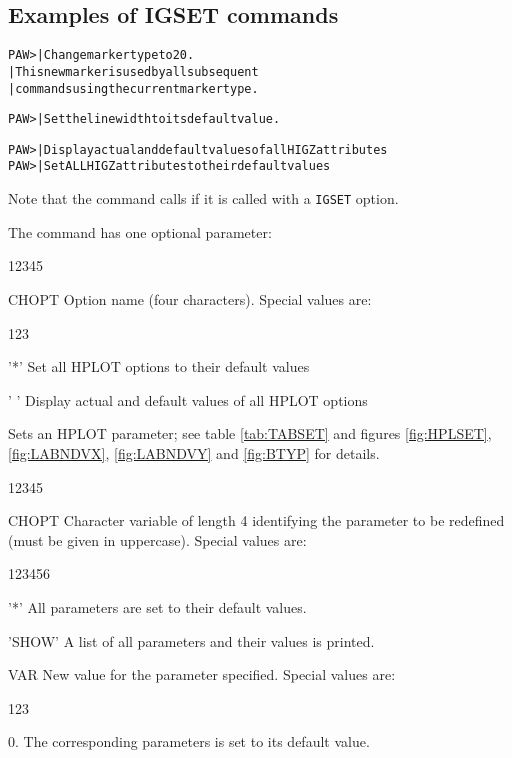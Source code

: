 \subsection*{Examples of IGSET commands}
\begin{alltt}
PAW >        | Change marker type to 20.
                          | This new marker is used by all subsequent
                          | commands using the current marker type.

PAW >           | Set the line width to its default value.

PAW >                | Display actual and default values of all HIGZ attributes
PAW >              | Set ALL HIGZ attributes to their default values
\end{alltt}

Note that the command  calls  if it is called 
with a \texttt{IGSET} option.


The  command has one optional parameter:
\begin{DLtt}{12345}
\item[CHOPT] Option name (four characters). Special values are:
    \begin{DLtt}{123}
      \item['*'] Set all HPLOT options to their default values
      \item[' '] Display actual and default values of all HPLOT options
    \end{DLtt}
\end{DLtt}


Sets an HPLOT parameter; see table \ref{tab:TABSET} and figures
\ref{fig:HPLSET}, \ref{fig:LABNDVX}, \ref{fig:LABNDVY} and \ref{fig:BTYP}
for details.

\begin{DLtt}{12345}
\item[CHOPT] Character variable of length 4 identifying the
             parameter to be redefined (must be given in uppercase). 
             Special values are:
    \begin{DLtt}{123456}
      \item['*']    All parameters are set to their default values.
      \item['SHOW'] A list of all parameters and their values is printed.
    \end{DLtt}
\item[VAR]   New value for the parameter specified. Special values are:
    \begin{DLtt}{123}
      \item[0.] The corresponding parameters is set to its default value.
    \end{DLtt}
\end{DLtt}

